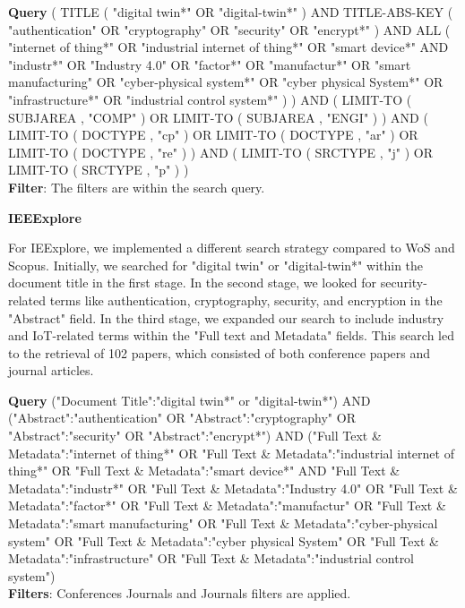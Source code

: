 \begin{tcolorbox}[colback=black!5!white, sharp corners=all, colframe=white!95!black]
\textbf{Query}
\tcblower
( TITLE ( "digital twin*" OR "digital-twin*" ) AND TITLE-ABS-KEY ( "authentication" OR "cryptography" OR "security" OR "encrypt*" ) AND ALL ( "internet of thing*" OR "industrial internet of thing*" OR "smart device*" AND "industr*" OR "Industry 4.0" OR "factor*" OR "manufactur*" OR "smart manufacturing" OR "cyber-physical system*" OR "cyber physical System*" OR "infrastructure*" OR "industrial control system*" ) ) AND ( LIMIT-TO ( SUBJAREA , "COMP" ) OR LIMIT-TO ( SUBJAREA , "ENGI" ) ) AND ( LIMIT-TO ( DOCTYPE , "cp" ) OR LIMIT-TO ( DOCTYPE , "ar" ) OR LIMIT-TO ( DOCTYPE , "re" ) ) AND ( LIMIT-TO ( SRCTYPE , "j" ) OR LIMIT-TO ( SRCTYPE , "p" ) ) \\

\textbf{Filter}: The filters are within the search query.
\end{tcolorbox}


\textbf{IEEExplore}

For IEExplore, we implemented a different search strategy compared to WoS and Scopus. Initially, we searched for "digital twin" or "digital-twin*" within the document title in the first stage. In the second stage, we looked for security-related terms like authentication, cryptography, security, and encryption in the "Abstract" field. In the third stage, we expanded our search to include industry and IoT-related terms within the "Full text and Metadata" fields. This search led to the retrieval of 102 papers, which consisted of both conference papers and journal articles.

\begin{tcolorbox}[colback=black!5!white, sharp corners=all, colframe=white!95!black]
\textbf{Query}
\tcblower
("Document Title":"digital twin*" or "digital-twin*") AND ("Abstract":"authentication" OR "Abstract":"cryptography" OR "Abstract":"security" OR "Abstract":"encrypt*") AND ("Full Text \& Metadata":"internet of thing*" OR "Full Text \& Metadata":"industrial internet of thing*" OR "Full Text \& Metadata":"smart device*" AND "Full Text \& Metadata":"industr*" OR "Full Text \& Metadata":"Industry 4.0" OR "Full Text \& Metadata":"factor*" OR "Full Text \& Metadata":"manufactur" OR "Full Text \& Metadata":"smart manufacturing" OR "Full Text \& Metadata":"cyber-physical system" OR "Full Text \& Metadata":"cyber physical System" OR "Full Text \& Metadata":"infrastructure" OR "Full Text \& Metadata":"industrial control system") \\

\textbf{Filters}: Conferences Journals and Journals filters are applied. 
\end{tcolorbox}

